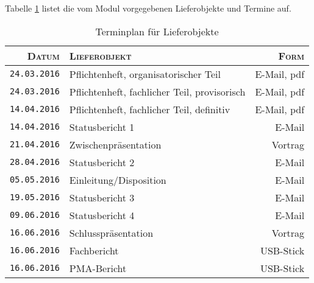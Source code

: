 Tabelle \ref{tab:lieferobj}  listet die  vom Modul  vorgegebenen Lieferobjekte
und Termine auf.

\begin{table}[h!]
    \centering
    \caption{Terminplan f\"ur Lieferobjekte}
    \label{tab:lieferobj}
    \begin{tabular}{rp{80mm}r}
        \toprule
        \textsc{Datum} & \textsc{Lieferobjekt} & \textsc{Form} \\
        \midrule
        \texttt{24.03.2016} & Pflichtenheft, organisatorischer Teil         & E-Mail, pdf \\
        \texttt{24.03.2016} & Pflichtenheft, fachlicher Teil, provisorisch  & E-Mail, pdf \\
        \texttt{14.04.2016} & Pflichtenheft, fachlicher Teil, definitiv     & E-Mail, pdf \\
        \texttt{14.04.2016} & Statusbericht 1                               & E-Mail \\
        \texttt{21.04.2016} & Zwischenpr\"asentation                        & Vortrag \\
        \texttt{28.04.2016} & Statusbericht 2                               & E-Mail \\
        \texttt{05.05.2016} & Einleitung/Disposition                        & E-Mail \\
        \texttt{19.05.2016} & Statusbericht 3                               & E-Mail \\
        \texttt{09.06.2016} & Statusbericht 4                               & E-Mail \\
        \texttt{16.06.2016} & Schlusspr\"asentation                         & Vortrag \\
        \texttt{16.06.2016} & Fachbericht                                   & USB-Stick \\
        \texttt{16.06.2016} & PMA-Bericht                                   & USB-Stick \\
        \bottomrule
    \end{tabular}
\end{table}

